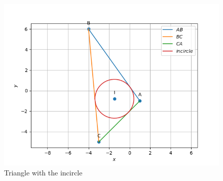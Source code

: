 \documentclass[journal,12pt,twocolumn]{IEEEtran}
\theoremstyle{remark}
\begin{document}
\begin{figure}[h]
	\centering
	\includegraphics[width=\columnwidth]{./Diagram.png}
	\caption{Triangle with the incircle}
	\label{Incircle}
  \end{figure}

\renewcommand{\thefigure}{\theenumi}
\renewcommand{\thetable}{\theenumi}
\end{document}
